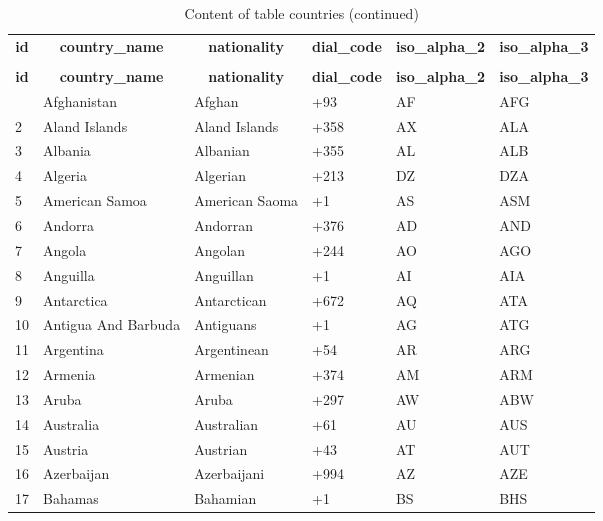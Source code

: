 %
%
 \begin{longtable}{|l|l|l|l|l|l|} 
 \hline \endhead \hline \endfoot \hline 
 \caption{Content of table countries} \label{tab:countries-data} \\\hline \multicolumn{1}{|c|}{\textbf{id}} & \multicolumn{1}{|c|}{\textbf{country\_name}} & \multicolumn{1}{|c|}{\textbf{nationality}} & \multicolumn{1}{|c|}{\textbf{dial\_code}} & \multicolumn{1}{|c|}{\textbf{iso\_alpha\_2}} & \multicolumn{1}{|c|}{\textbf{iso\_alpha\_3}} \\ \hline \hline  \endfirsthead 
\caption{Content of table countries (continued)} \\ \hline \multicolumn{1}{|c|}{\textbf{id}} & \multicolumn{1}{|c|}{\textbf{country\_name}} & \multicolumn{1}{|c|}{\textbf{nationality}} & \multicolumn{1}{|c|}{\textbf{dial\_code}} & \multicolumn{1}{|c|}{\textbf{iso\_alpha\_2}} & \multicolumn{1}{|c|}{\textbf{iso\_alpha\_3}} \\ \hline \hline \endhead \endfoot
1 & Afghanistan & Afghan & +93 & AF & AFG \\ \hline 
2 & Aland Islands & Aland Islands & +358 & AX & ALA \\ \hline 
3 & Albania & Albanian & +355 & AL & ALB \\ \hline 
4 & Algeria & Algerian & +213 & DZ & DZA \\ \hline 
5 & American Samoa & American Saoma & +1 & AS & ASM \\ \hline 
6 & Andorra & Andorran & +376 & AD & AND \\ \hline 
7 & Angola & Angolan & +244 & AO & AGO \\ \hline 
8 & Anguilla & Anguillan & +1 & AI & AIA \\ \hline 
9 & Antarctica & Antarctican & +672 & AQ & ATA \\ \hline 
10 & Antigua And Barbuda & Antiguans & +1 & AG & ATG \\ \hline 
11 & Argentina & Argentinean & +54 & AR & ARG \\ \hline 
12 & Armenia & Armenian & +374 & AM & ARM \\ \hline 
13 & Aruba & Aruba & +297 & AW & ABW \\ \hline 
14 & Australia & Australian & +61 & AU & AUS \\ \hline 
15 & Austria & Austrian & +43 & AT & AUT \\ \hline 
16 & Azerbaijan & Azerbaijani & +994 & AZ & AZE \\ \hline 
17 & Bahamas & Bahamian & +1 & BS & BHS \\ \hline 

\end{longtable}
